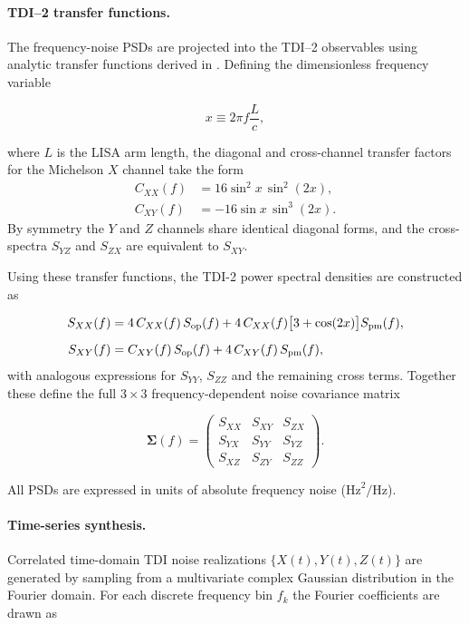\paragraph{TDI--2 transfer functions.}
The frequency-noise PSDs are projected into the TDI--2 observables using
analytic transfer functions derived in \citet{Nam2023}.
Defining the dimensionless frequency variable

\begin{equation}
x \equiv 2\pi f \frac{L}{c},
\end{equation}

where $L$ is the LISA arm length, the diagonal and cross-channel
transfer factors for the Michelson $X$ channel take the form
%
\begin{align}
C_{XX}(f) &= 16 \sin^2 x \, \sin^2 (2x),
\\[4pt]
C_{XY}(f) &= -16 \sin x \, \sin^3 (2x).
\end{align}
%
By symmetry the $Y$ and $Z$ channels share identical diagonal forms,
and the cross-spectra $S_{YZ}$ and $S_{ZX}$ are equivalent to $S_{XY}$.

Using these transfer functions, the TDI-2 power spectral densities are
constructed as

\begin{align}
S_{XX}(f) &=
4\,C_{XX}(f)\,S_{\rm op}(f)
+
4\,C_{XX}(f)
\bigl[3+\cos(2x)\bigr]
S_{\rm pm}(f),
\\[6pt]
S_{XY}(f) &=
C_{XY}(f)\,S_{\rm op}(f)
+
4\,C_{XY}(f)\,S_{\rm pm}(f),
\end{align}
%
with analogous expressions for $S_{YY}$, $S_{ZZ}$ and the remaining
cross terms.  Together these define the full
$3\times3$ frequency-dependent noise covariance matrix

\begin{equation}
\boldsymbol{\Sigma}(f)
=
\begin{pmatrix}
S_{XX} & S_{XY} & S_{ZX}\\
S_{YX} & S_{YY} & S_{YZ}\\
S_{XZ} & S_{ZY} & S_{ZZ}
\end{pmatrix}.
\end{equation}

All PSDs are expressed in units of absolute frequency noise
($\mathrm{Hz}^2/\mathrm{Hz}$).

\paragraph{Time-series synthesis.}
Correlated time-domain TDI noise realizations
$\{X(t),Y(t),Z(t)\}$ are generated by sampling from a multivariate complex
Gaussian distribution in the Fourier domain.
For each discrete frequency bin $f_k$ the Fourier coefficients are drawn as

